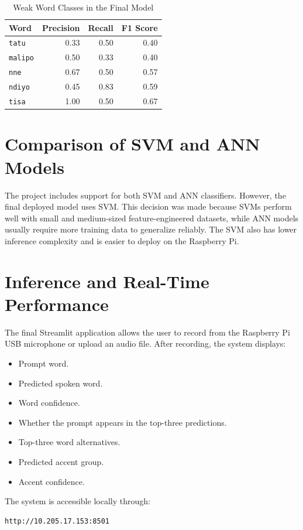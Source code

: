 \documentclass[12pt,a4paper]{report}
\begin{document}
\begin{table}[H]
\centering
\caption{Weak Word Classes in the Final Model}
\begin{tabular}{lrrr}
\toprule
\textbf{Word} & \textbf{Precision} & \textbf{Recall} & \textbf{F1 Score}\\
\midrule
\texttt{tatu} & 0.33 & 0.50 & 0.40\\
\texttt{malipo} & 0.50 & 0.33 & 0.40\\
\texttt{nne} & 0.67 & 0.50 & 0.57\\
\texttt{ndiyo} & 0.45 & 0.83 & 0.59\\
\texttt{tisa} & 1.00 & 0.50 & 0.67\\
\bottomrule
\end{tabular}
\end{table}

\section{Comparison of SVM and ANN Models}
The project includes support for both SVM and ANN classifiers. However, the final deployed model uses SVM. This decision was made because SVMs perform well with small and medium-sized feature-engineered datasets, while ANN models usually require more training data to generalize reliably. The SVM also has lower inference complexity and is easier to deploy on the Raspberry Pi.

\section{Inference and Real-Time Performance}
The final Streamlit application allows the user to record from the Raspberry Pi USB microphone or upload an audio file. After recording, the system displays:
\begin{itemize}
    \item Prompt word.
    \item Predicted spoken word.
    \item Word confidence.
    \item Whether the prompt appears in the top-three predictions.
    \item Top-three word alternatives.
    \item Predicted accent group.
    \item Accent confidence.
\end{itemize}

The system is accessible locally through:
\begin{verbatim}
http://10.205.17.153:8501
\end{verbatim}
\end{document}
